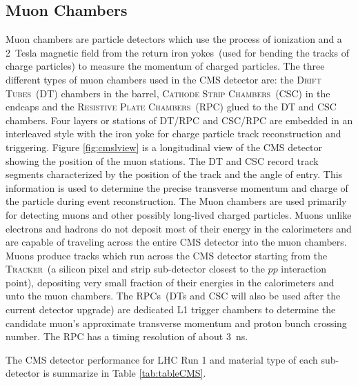 \subsection{Muon Chambers}
Muon chambers are particle detectors which use the process of ionization and a 2~Tesla magnetic field from the return iron yokes~(used for bending the tracks of charge particles) to measure the momentum of charged particles. The three different types of muon chambers used in the CMS detector are: the \textsc{Drift Tubes}~(DT) chambers in the barrel, \textsc{Cathode Strip Chambers}~(CSC) in the endcaps and the \textsc{Resistive Plate Chambers}~(RPC) glued to the DT and CSC chambers. Four layers or stations of DT/RPC and CSC/RPC are embedded in an interleaved  style with the iron yoke for charge particle track reconstruction and triggering. Figure \ref{fig:cmslview} is a longitudinal view of the CMS detector showing the position of the muon stations.
The DT and CSC record track segments characterized by the position of the track and the angle of entry. This information is used to determine the precise transverse momentum and charge of the particle during event reconstruction. 
\newline
The Muon chambers are used primarily for detecting muons and other possibly long-lived charged particles. Muons unlike electrons and hadrons do not deposit most of their energy in the calorimeters and are capable of traveling across the entire CMS detector into the muon chambers. Muons produce tracks which run across the CMS detector starting from the \textsc{Tracker}~(a silicon pixel and strip sub-detector closest to the $pp$ interaction point), depositing very small fraction of their energies in the calorimeters and unto the muon chambers. The RPCs~(DTs and CSC will also be used after the current detector upgrade) are dedicated L1 trigger chambers to determine the candidate muon's approximate transverse momentum and proton bunch crossing number. The RPC has a timing resolution of about 3~ns.
\par 
The CMS detector performance for LHC Run 1 and material type of each sub-detector is summarize in Table \ref{tab:tableCMS}.


